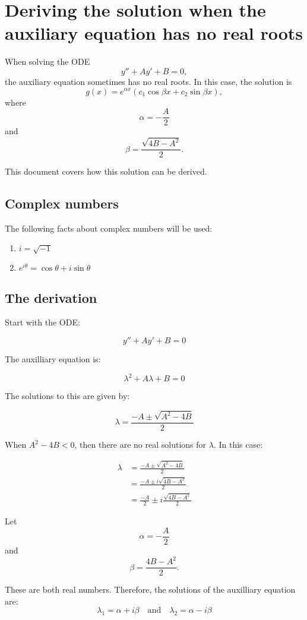 \documentclass[11pt,a4paper,oneside]{book}
\begin{document}
\section*{Deriving the solution when the auxiliary equation has no real roots}

When solving the ODE \[y'' + Ay' + B = 0,\] the auxiliary equation sometimes has no real roots. In this case, the solution is 
\[g(x)=e^{\alpha x}\left( c_1\cos \beta x + c_2\sin \beta x \right),\]
where \[\alpha=-\frac{A}{2}\] and \[\beta=\frac{\sqrt{4B-A^2}}{2}.\]

This document covers how this solution can be derived.

\subsection*{Complex numbers}
The following facts about complex numbers will be used:
\begin{enumerate}
\item \(\displaystyle i=\sqrt{-1}\)
\item \(\displaystyle e^{i\theta} = \cos\theta+i\sin\theta\)
\end{enumerate}

\subsection*{The derivation}

Start with the ODE:

\[y''+Ay'+B=0\]

The auxilliary equation is:

\[\lambda^2+A\lambda+B=0\]

The solutions to this are given by:

\[\lambda = \frac{-A\pm\sqrt{A^2-4B}}{2}\]

When $A^2-4B<0$, then there are no real solutions for $\lambda$. In this case:

\begin{align*}
\lambda
&= \frac{-A\pm\sqrt{A^2-4B}}{2}\\
&= \frac{-A\pm i\sqrt{4B-A^2}}{2}\\
&= \frac{-A}{2}\pm i\frac{\sqrt{4B-A^2}}{2}
\end{align*}

Let \[\alpha = -\frac{A}{2}\] and \[\beta=\frac{4B-A^2}{2}.\]

These are both real numbers. Therefore, the solutions of the auxilliary equation are:
\[\lambda_1 = \alpha + i\beta\quad\text{and}\quad\lambda_2 = \alpha - i\beta\]
\end{document}

